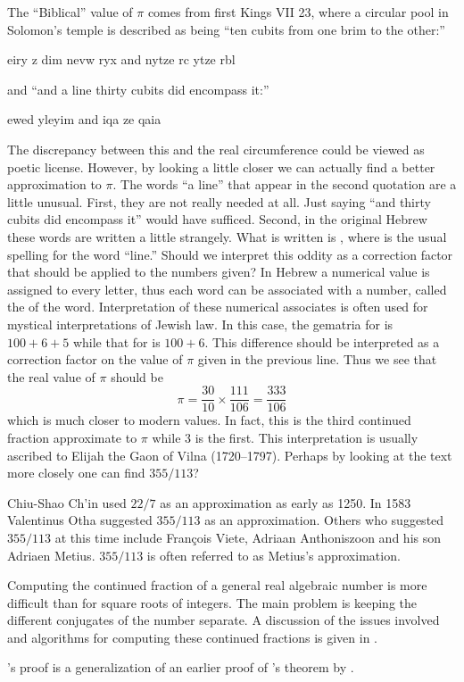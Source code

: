 The ``Biblical'' value of $\pi$ comes from first Kings VII 23, where a
circular pool in Solomon's temple is described as being ``ten cubits from
one brim to the other:''
\begin{semitic}
 eiry {}z dim nevw ryx a{}nd nytze rc ytze rbl
\end{semitic}
\noindent
and ``and a line thirty cubits did encompass it:''
 \begin{semitic}
ewed yleyim a{}nd iqa {}ze qaia 
\end{semitic}
\noindent
The discrepancy between this and the real circumference could be viewed
as poetic license.  However, by looking a little closer we can actually
find a better approximation to $\pi$.  The words ``a line'' that appear in
the second quotation are a little unusual.  First, they are not
really needed at all.  Just saying ``and thirty cubits did encompass it''
would have sufficed.  Second, in the original Hebrew these words are
written a little strangely.  What is written is , where
 is the usual spelling for the word ``line.''  Should we interpret
this oddity as a correction factor that should be applied to the
numbers given?  In Hebrew a numerical value is assigned to every
letter, thus each word can be associated with a number, called the
 of the word.  Interpretation of these numerical
associates is often used for mystical interpretations of Jewish law.
In this case, the gematria for  is $100+6+5$ while that for
 is $100+6$.  This difference should be interpreted as a
correction factor on the value of $\pi$ given in the previous line.
Thus we see that the real value of $\pi$ 
should be 
\[
\pi = \frac{30}{10} \times \frac{111}{106} = \frac{333}{106}
\]
which is much closer to modern values.  In fact, this is the third
continued fraction approximate to $\pi$ while $3$ is the first.  This
interpretation is usually ascribed to Elijah the Gaon of
Vilna (1720--1797).  Perhaps by looking
at the text more closely one can find $355/113$?

Chiu-Shao Ch'in used $22/7$ as an approximation
as early as 1250.  In 1583 Valentinus Otha
suggested $355/113$ as an approximation.  Others who suggested
$355/113$ at this time include Fran\c{c}ois Viete, Adriaan Anthoniszoon and
his son Adriaen Metius. $355/113$ is often
referred to as Metius's approximation.

  Computing the continued fraction of a
general real algebraic number is more difficult than for square roots
of integers.  The main problem is keeping the different conjugates of
the number separate.  A discussion of the issues involved and
algorithms for computing these continued fractions is given in
\cite{Cantor72,Thull84}.

 {\Nathanson}'s proof is a
generalization of an earlier proof of {\Hurwitz}'s theorem by {\CohnJHE}
\cite{Cohn73}.

\normalsize


